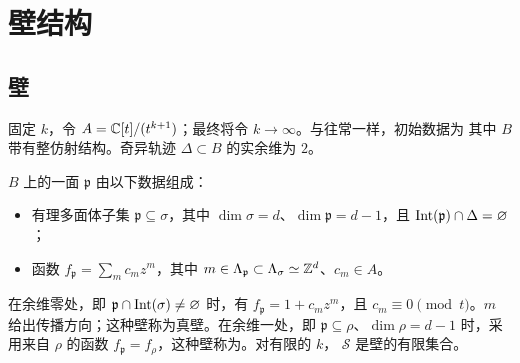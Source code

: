 \section{壁结构}
\subsection{壁}
固定 $k$，令 $A=\mathbb C[t]/(t^{k+1})$；最终将令 $k\to\infty$。与往常一样，初始数据为
其中 $B$ 带有整仿射结构。奇异轨迹 $\Delta\subset B$ 的实余维为 $2$。
\begin{definition}\label{def:5.4}
$B$ 上的一面 $\mathfrak p$ 由以下数据组成：
\begin{itemize}
\item 有理多面体子集 $\mathfrak p\subseteq\sigma$，其中 $\dim\sigma=d$、$\dim\mathfrak p=d-1$，且 $\operatorname{Int}(\mathfrak p)\cap\Delta=\varnothing$；
\item 函数 $f_{\mathfrak p}=\sum_mc_mz^m$，其中 $m\in\Lambda_{\mathfrak p}\subset\Lambda_\sigma\simeq\mathbb Z^d$、$c_m\in A$。
\end{itemize}
\end{definition}
在余维零处，即 $\mathfrak p\cap\operatorname{Int}(\sigma)\ne\varnothing$ 时，有 $f_{\mathfrak p}=1+c_mz^m$，且 $c_m\equiv0\pmod t$。$m$ 给出传播方向；这种壁称为真壁。在余维一处，即 $\mathfrak p\subseteq\rho$、$\dim\rho=d-1$ 时，采用来自 $\rho$ 的函数 $f_{\mathfrak p}=f_\rho$，这种壁称为。对有限的 $k$， $\mathscr S$ 是壁的有限集合。

